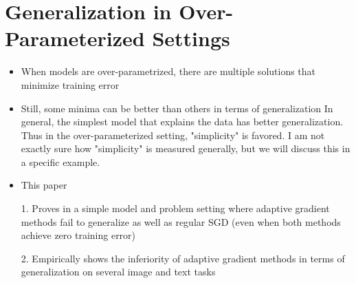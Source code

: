 \documentclass[12pt]{article}
\begin{document}
\section{Generalization in Over-Parameterized Settings}
\begin{itemize}
  \item When models are over-parametrized, there are multiple solutions that minimize training error
  \item Still, some minima can be better than others in terms of generalization
  	\subitem In general, the simplest model that explains the data has better generalization. Thus in the over-parameterized setting, "simplicity" is favored.
	\subitem I am not exactly sure how "simplicity" is measured generally, but we will discuss this in a specific example.
  \item This paper
  	
	1. Proves in a simple model and problem setting where adaptive gradient methods fail to generalize as well as regular SGD (even when both methods achieve zero training error)
	
	2. Empirically shows the inferiority of adaptive gradient methods in terms of generalization on several image and text tasks
\end{itemize}
\end{document}
